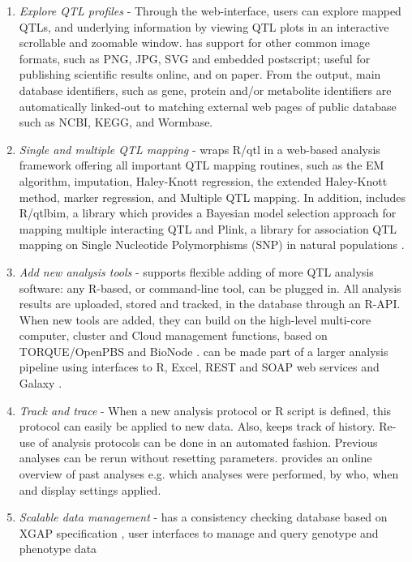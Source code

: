 \begin{enumerate}\itemsep1pt
\item \emph{Explore QTL profiles} - Through the web-interface, users can explore mapped QTLs, and 
underlying information by viewing QTL plots in an interactive scrollable and zoomable window. 
\xqtlwb has support for other common image formats, such as PNG, JPG, SVG and embedded postscript; 
useful for publishing scientific results online, and on paper. From the output, main database identifiers, 
such as gene, protein and/or metabolite identifiers are automatically linked-out to matching external 
web pages of public database such as NCBI, KEGG, and Wormbase.
\item \emph{Single and multiple QTL mapping} - \xqtlwb wraps R/qtl \cite{Broman:2003, Arends:2010} in a 
web-based analysis framework offering all important QTL mapping routines, such as the EM algorithm, 
imputation, Haley-Knott regression, the extended Haley-Knott method, marker regression, and Multiple 
QTL mapping. In addition, \xqtlwb includes R/qtlbim, a library which provides a Bayesian model 
selection approach for mapping multiple interacting QTL \cite{Yandell:2007} and Plink, a library for 
association QTL mapping on Single Nucleotide Polymorphisms (SNP) in natural populations \cite{Purcell:2007}.
\item \emph{Add new analysis tools} - \xqtlwb supports flexible adding of more QTL analysis software: 
any R-based, or command-line tool, can be plugged in. All analysis results are uploaded, stored and 
tracked, in the \xqtlwb database through an R-API. When new tools are added, they can build on the 
high-level multi-core computer, cluster and Cloud management functions, based on TORQUE/OpenPBS and 
BioNode \cite{Prins:2012}. \xqtlwb can be made part of a larger analysis pipeline using interfaces to R, 
Excel, REST and SOAP web services and Galaxy \cite{Goecks:2010}.
\item \emph{Track and trace} - When a new analysis protocol or R script is defined, this protocol 
can easily be applied to new data. Also, \xqtlwb keeps track of history. Re-use of analysis protocols 
can be done in an automated fashion. Previous analyses can be rerun without resetting parameters. 
\xqtlwb provides an online overview of past analyses e.g. which analyses were performed, by who, when 
and display settings applied.
\item \emph{Scalable data management} - \xqtlwb has a consistency checking database based on XGAP 
specification \cite{Swertz:2010a}, user interfaces to manage and query genotype and phenotype data 

\end{enumerate}
